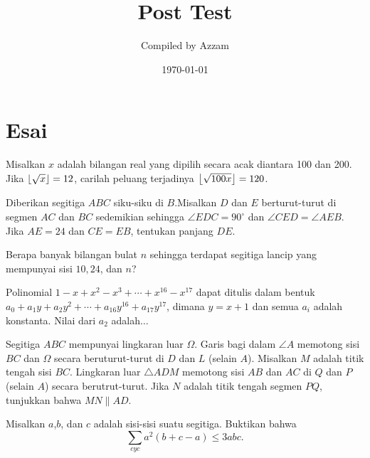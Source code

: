 \documentclass[11pt]{scrartcl}
\begin{document}
	\title{Post Test} %
	\date{\today}
	\author{Compiled by Azzam}
	\maketitle
	
	\section{Esai}
	
	\begin{soalbaru}
	Misalkan $x$ adalah bilangan real yang dipilih secara acak diantara 100 dan 200. Jika $\left\lfloor \sqrt{x} \right\rfloor=12$, carilah peluang terjadinya $\left\lfloor \sqrt{100x} \right\rfloor=120$.
	\end{soalbaru}
	
	\begin{soalbaru}
	Diberikan segitiga $ABC$ siku-siku di $B$.Misalkan $D$ dan $E$ berturut-turut di segmen $AC$ dan $BC$ sedemikian sehingga $\angle EDC= 90^\circ$ dan $\angle CED = \angle AEB$. Jika $AE = 24$ dan $CE=EB$, tentukan panjang $DE$.
	\end{soalbaru}
	
	\begin{soalbaru}
	Berapa banyak bilangan bulat $n$ sehingga terdapat segitiga lancip yang mempunyai sisi $10,24$, dan $n$?
	\end{soalbaru}

	\begin{soalbaru}
	Polinomial $1-x+x^2-x^3+\cdots+x^{16}-x^{17}$ dapat ditulis dalam bentuk $a_0+a_1y+a_2y^2+\cdots +a_{16}y^{16}+a_{17}y^{17}$, dimana $y=x+1$ dan semua $a_i$ adalah konstanta. Nilai dari $a_2$ adalah$\dots$
	\end{soalbaru}
 
	\begin{soalbaru}
	Segitiga $ABC$ mempunyai lingkaran luar $\Omega$. Garis bagi dalam $\angle A$ memotong sisi $BC$ dan $\Omega$ secara beruturut-turut di $D$ dan $L$ (selain $A$). Misalkan $M$ adalah titik tengah sisi $BC$. Lingkaran luar $\triangle  ADM$ memotong sisi $AB$ dan $AC$ di $Q$ dan $P$ (selain $A$) secara berutrut-turut. Jika $N$ adalah titik tengah segmen $PQ$, tunjukkan bahwa $MN \parallel AD$. 
	\end{soalbaru}
	
	\begin{soalbaru}
	Misalkan $a$,$b$, dan $c$ adalah sisi-sisi suatu segitiga. Buktikan bahwa$$\sum_{cyc} a^2(b+c-a) \le 3abc.$$
	\end{soalbaru}
\end{document}
